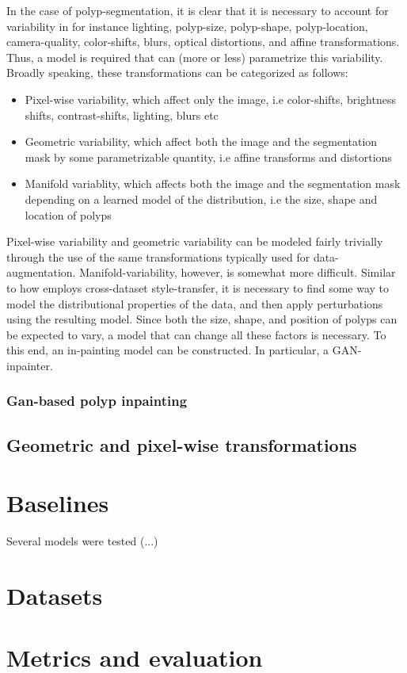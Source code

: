   		In the case of polyp-segmentation, it is clear that it is necessary to account for variability in for instance lighting, polyp-size, polyp-shape, polyp-location, camera-quality, color-shifts, blurs, optical distortions, and affine transformations. Thus, a model is required that can (more or less) parametrize this variability. Broadly speaking, these transformations can be categorized as follows:
  		\begin{itemize}
  			\item Pixel-wise variability, which affect only the image, i.e color-shifts, brightness shifts, contrast-shifts, lighting, blurs etc
  			\item Geometric variability, which affect both the image and the segmentation mask by some parametrizable quantity, i.e affine transforms and distortions
  			\item Manifold variablity, which affects both the image and the segmentation mask depending on a learned model of the distribution,  i.e the size, shape and location of polyps
  		\end{itemize}
  		Pixel-wise variability and geometric variability can be modeled fairly trivially through the use of the same transformations typically used for data-augmentation. Manifold-variability, however, is somewhat more difficult. Similar to how \cite{modelbased} employs cross-dataset style-transfer, it is necessary to find some way to model the distributional properties of the data, and then apply perturbations using the resulting model. Since both the size, shape, and position of polyps can be expected to vary, a model that can change all these factors is necessary. To this end, an in-painting model can be constructed. In particular, a GAN-inpainter.	
  		\subsubsection{Gan-based polyp inpainting}
  		\subsection{Geometric and pixel-wise transformations}
  		
  		
  			
\section{Baselines}
Several models were tested (...)
\section{Datasets}

\section{Metrics and evaluation}
